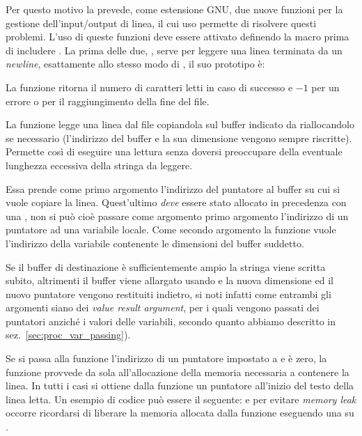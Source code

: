 Per questo motivo la  prevede, come estensione GNU, due nuove
funzioni per la gestione dell'input/output di linea, il cui uso permette di
risolvere questi problemi. L'uso di queste funzioni deve essere attivato
definendo la macro  prima di includere
. La prima delle due, , serve per leggere una
linea terminata da un \textit{newline}, esattamente allo stesso modo di
, il suo prototipo è:

\begin{funcproto}{
}

{La funzione ritorna il numero di caratteri letti in caso di successo e $-1$
  per un errore o per il raggiungimento della fine del file.}
\end{funcproto}

La funzione legge una linea dal file  copiandola sul buffer
indicato da  riallocandolo se necessario (l'indirizzo del buffer
e la sua dimensione vengono sempre riscritte). Permette così di eseguire una
lettura senza doversi preoccupare della eventuale lunghezza eccessiva della
stringa da leggere. 

Essa prende come primo argomento l'indirizzo del puntatore al buffer su cui si
vuole copiare la linea. Quest'ultimo \emph{deve} essere stato allocato in
precedenza con una , non si può cioè passare come argomento primo
argomento l'indirizzo di un puntatore ad una variabile locale. Come secondo
argomento la funzione vuole l'indirizzo della variabile contenente le
dimensioni del buffer suddetto.

Se il buffer di destinazione è sufficientemente ampio la stringa viene scritta
subito, altrimenti il buffer viene allargato usando  e la nuova
dimensione ed il nuovo puntatore vengono restituiti indietro, si noti infatti
come entrambi gli argomenti siano dei \textit{value result argument}, per i
quali vengono passati dei puntatori anziché i valori delle variabili, secondo
quanto abbiamo descritto in sez.~\ref{sec:proc_var_passing}).

Se si passa alla funzione l'indirizzo di un puntatore impostato a  e
 è zero, la funzione provvede da sola all'allocazione della memoria
necessaria a contenere la linea. In tutti i casi si ottiene dalla funzione un
puntatore all'inizio del testo della linea letta. Un esempio di codice può
essere il seguente: 
e per evitare \textit{memory leak} occorre ricordarsi di liberare la memoria
allocata dalla funzione eseguendo una  su .

